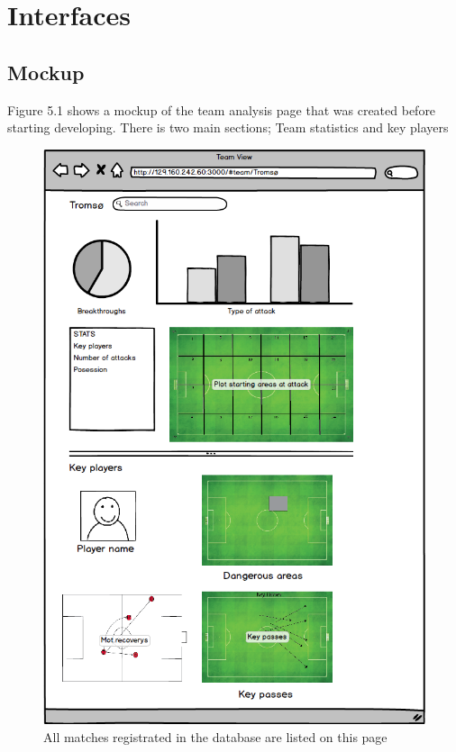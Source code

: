 
\section{Interfaces}

\subsection{Mockup}

Figure 5.1 shows a mockup of the team analysis page that was created before starting developing. There is two main sections; Team statistics and key players

\begin{figure}[ht!]
\centering
\includegraphics[width=150mm]{images/general/mockup.png}
\caption{All matches registrated in the database are listed on this page}
\label{overflow}
\end{figure}


